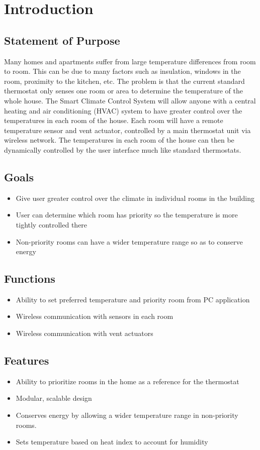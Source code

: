 \section{Introduction}
\subsection{Statement of Purpose}
Many homes and apartments suffer from large temperature differences from room to room. This can be due to many factors such as insulation, windows in the room, proximity to the kitchen, etc.  The problem is that the current standard thermostat only senses one room or area to determine the temperature of the whole house.  The Smart Climate Control System will allow anyone with a central heating and air conditioning (HVAC) system to have greater control over the temperatures in each room of the house.  Each room will have a remote temperature sensor and vent actuator, controlled by a main thermostat unit via wireless network.  The temperatures in each room of the house can then be dynamically controlled by the user interface much like standard thermostats.

\subsection{Goals}
\begin{itemize}
\item
Give user greater control over the climate in individual rooms in the building
\item
User can determine which room has priority so the temperature is more tightly controlled there
\item
Non-priority rooms can have a wider temperature range so as to conserve energy
\end{itemize}

\subsection{Functions}
\begin{itemize}
\item
Ability to set preferred temperature and priority room from PC application
\item
Wireless communication with sensors in each room
\item
Wireless communication with vent actuators
\end{itemize}

\subsection{Features}
\begin{itemize}
\item
Ability to prioritize rooms in the home as a reference for the thermostat
\item
Modular, scalable design
\item
Conserves energy by allowing a wider temperature range in non-priority rooms.
\item
Sets temperature based on heat index to account for humidity
\end{itemize}

